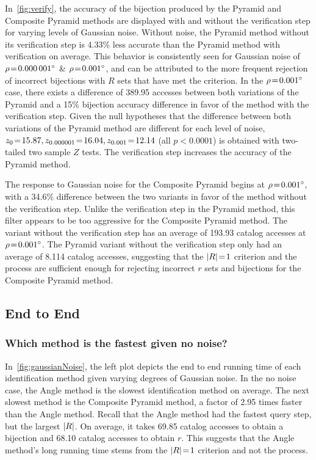\documentclass[conference]{IEEEtran}
\begin{document}
    In~\autoref{fig:verify}, the accuracy of the bijection produced by the Pyramid and Composite Pyramid methods are
    displayed with and without the verification step for varying levels of Gaussian noise.
    Without noise, the Pyramid method without its verification step is 4.33\% less accurate than the Pyramid method with
    verification on average.
    This behavior is consistently seen for Gaussian noise of $\rho\!=\!\ang{0.000001}$ \& $\rho\!=\!\ang{0.001}$, and
    can be attributed to the more frequent rejection of incorrect bijections with $R$ sets that have met the criterion.
    In the $\rho\!=\!\ang{0.001}$ case, there exists a difference of 389.95 accesses between both variations of the Pyramid
    and a 15\% bijection accuracy difference in favor of the method with the verification step.
    Given the null hypotheses that the difference between both variations of the Pyramid method are different for each level
    of noise, $z_0 \!=\! 15.87, z_{0.000001} \!=\! 16.04, z_{0.001} \!=\! 12.14$ (all $p\!<\!0.0001$) is obtained with
    two-tailed two sample $Z$ tests.
    The verification step increases the accuracy of the Pyramid method.

    The response to Gaussian noise for the Composite Pyramid begins at $\rho\!=\!\ang{0.001}$, with a 34.6\% difference
    between the two variants in favor of the method without the verification step.
    Unlike the verification step in the Pyramid method, this filter appears to be too aggressive for the Composite Pyramid
    method.
    The variant without the verification step has an average of 193.93 catalog accesses at $\rho\!=\!\ang{0.001}$.
    The Pyramid variant without the verification step only had an average of 8.114 catalog accesses, suggesting that the
    $\left| R \right| \!=\! 1$ criterion and the  process are sufficient enough for rejecting incorrect $r$ sets and
    bijections for the Composite Pyramid method.

    \subsection{End to End}\label{subsec:endToEndEvaluation}
    \subsubsection{Which method is the fastest given no noise?}
    In~\autoref{fig:gaussianNoise}, the left plot depicts the end to end running time of each identification method given
    varying degrees of Gaussian noise.
    In the no noise case, the Angle method is the slowest identification method on average.
    The next slowest method is the Composite Pyramid method, a factor of 2.95 times faster than the Angle method.
    Recall that the Angle method had the fastest query step, but the largest $\left| R \right|$.
    On average, it takes 69.85 catalog accesses to obtain a bijection and 68.10 catalog accesses to obtain $r$.
    This suggests that the Angle method's long running time stems from the $\left| R \right| \!=\! 1$ criterion and not the
     process.
\end{document}
